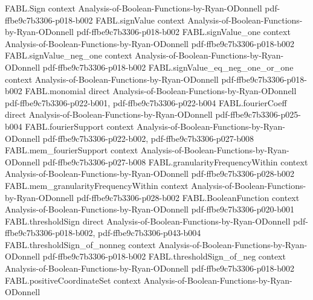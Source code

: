 \begin{theorem}
\label{FABL.centeredLinearSquare_fourthMoment_le}
\leanok
{}
\proofstep
  {FABL.Sign}
  {context}
  {Analysis-of-Boolean-Functions-by-Ryan-ODonnell}
  {pdf-ffbe9c7b3306-p018-b002}
\proofstep
  {FABL.signValue}
  {context}
  {Analysis-of-Boolean-Functions-by-Ryan-ODonnell}
  {pdf-ffbe9c7b3306-p018-b002}
\proofstep
  {FABL.signValue_one}
  {context}
  {Analysis-of-Boolean-Functions-by-Ryan-ODonnell}
  {pdf-ffbe9c7b3306-p018-b002}
\proofstep
  {FABL.signValue_neg_one}
  {context}
  {Analysis-of-Boolean-Functions-by-Ryan-ODonnell}
  {pdf-ffbe9c7b3306-p018-b002}
\proofstep
  {FABL.signValue_eq_neg_one_or_one}
  {context}
  {Analysis-of-Boolean-Functions-by-Ryan-ODonnell}
  {pdf-ffbe9c7b3306-p018-b002}
\proofstep
  {FABL.monomial}
  {direct}
  {Analysis-of-Boolean-Functions-by-Ryan-ODonnell}
  {pdf-ffbe9c7b3306-p022-b001,
    pdf-ffbe9c7b3306-p022-b004}
\proofstep
  {FABL.fourierCoeff}
  {direct}
  {Analysis-of-Boolean-Functions-by-Ryan-ODonnell}
  {pdf-ffbe9c7b3306-p025-b004}
\proofstep
  {FABL.fourierSupport}
  {context}
  {Analysis-of-Boolean-Functions-by-Ryan-ODonnell}
  {pdf-ffbe9c7b3306-p022-b002,
    pdf-ffbe9c7b3306-p027-b008}
\proofstep
  {FABL.mem_fourierSupport}
  {context}
  {Analysis-of-Boolean-Functions-by-Ryan-ODonnell}
  {pdf-ffbe9c7b3306-p027-b008}
\proofstep
  {FABL.granularityFrequencyWithin}
  {context}
  {Analysis-of-Boolean-Functions-by-Ryan-ODonnell}
  {pdf-ffbe9c7b3306-p028-b002}
\proofstep
  {FABL.mem_granularityFrequencyWithin}
  {context}
  {Analysis-of-Boolean-Functions-by-Ryan-ODonnell}
  {pdf-ffbe9c7b3306-p028-b002}
\proofstep
  {FABL.BooleanFunction}
  {context}
  {Analysis-of-Boolean-Functions-by-Ryan-ODonnell}
  {pdf-ffbe9c7b3306-p020-b001}
\proofstep
  {FABL.thresholdSign}
  {direct}
  {Analysis-of-Boolean-Functions-by-Ryan-ODonnell}
  {pdf-ffbe9c7b3306-p018-b002,
    pdf-ffbe9c7b3306-p043-b004}
\proofstep
  {FABL.thresholdSign_of_nonneg}
  {context}
  {Analysis-of-Boolean-Functions-by-Ryan-ODonnell}
  {pdf-ffbe9c7b3306-p018-b002}
\proofstep
  {FABL.thresholdSign_of_neg}
  {context}
  {Analysis-of-Boolean-Functions-by-Ryan-ODonnell}
  {pdf-ffbe9c7b3306-p018-b002}
\proofstep
  {FABL.positiveCoordinateSet}
  {context}
  {Analysis-of-Boolean-Functions-by-Ryan-ODonnell}

\end{theorem}
